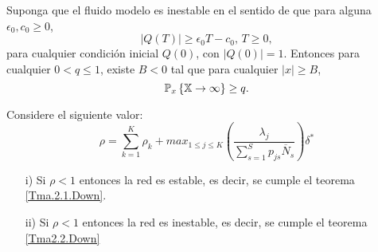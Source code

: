 
\begin{Teo}\label{Tma2.2.Down}
Suponga que el fluido modelo es inestable en el sentido de que
para alguna $\epsilon_{0},c_{0}\geq0$,
\begin{equation}\label{Eq.Inestability}
|Q\left(T\right)|\geq\epsilon_{0}T-c_{0}\textrm{,   }T\geq0,
\end{equation}
para cualquier condici\'on inicial $Q\left(0\right)$, con
$|Q\left(0\right)|=1$. Entonces para cualquier $0<q\leq1$, existe
$B<0$ tal que para cualquier $|x|\geq B$,
\begin{equation}
\mathbb{P}_{x}\left\{\mathbb{X}\rightarrow\infty\right\}\geq q.
\end{equation}
\end{Teo}

\begin{Teo}\label{Tma2.3.Down}
Considere el siguiente valor:
\begin{equation}\label{Eq.Rho.1serv}
\rho=\sum_{k=1}^{K}\rho_{k}+max_{1\leq j\leq K}\left(\frac{\lambda_{j}}{\sum_{s=1}^{S}p_{js}\overline{N}_{s}}\right)\delta^{*}
\end{equation}
\begin{itemize}
\item[i)] Si $\rho<1$ entonces la red es estable, es decir, se cumple el teorema \ref{Tma.2.1.Down}.

\item[ii)] Si $\rho<1$ entonces la red es inestable, es decir, se cumple el teorema \ref{Tma2.2.Down}
\end{itemize}
\end{Teo}




